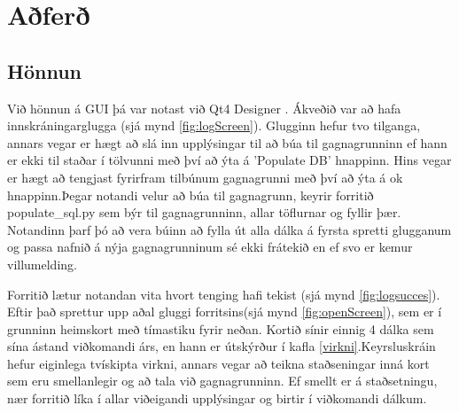 \documentclass[12pt, git, final]{rureport}
\begin{document}



\section{Aðferð}
\subsection{Hönnun}
Við hönnun á GUI þá var notast við Qt4 Designer \cite{qt4}. Ákveðið var að hafa innskráningarglugga (sjá mynd \ref{fig:logScreen}). Glugginn hefur tvo tilganga, annars vegar er hægt að slá inn upplýsingar til að búa til gagnagrunninn ef hann er ekki til staðar í tölvunni með því að ýta á 'Populate DB' hnappinn. Hins vegar er hægt að tengjast fyrirfram tilbúnum gagnagrunni með því að ýta á ok hnappinn.Þegar notandi velur að búa til gagnagrunn, keyrir forritið populate\_sql.py sem býr til gagnagrunninn, allar töflurnar og fyllir þær. Notandinn þarf þó að vera búinn að fylla út alla dálka á fyrsta spretti glugganum og passa nafnið á nýja gagnagrunninum sé ekki frátekið en ef svo er kemur villumelding.

Forritið lætur notandan vita hvort tenging hafi tekist (sjá mynd \ref{fig:logsucces}). Eftir það sprettur upp aðal gluggi forritsins(sjá mynd \ref{fig:openScreen}), sem er í grunninn heimskort með tímastiku fyrir neðan. Kortið sínir einnig 4 dálka sem sína ástand viðkomandi árs, en hann er útskýrður  í kafla \ref{virkni}.Keyrsluskráin hefur eiginlega tvískipta virkni, annars vegar að teikna staðseningar inná kort sem eru smellanlegir og að tala við gagnagrunninn. Ef smellt er á staðsetningu, nær forritið líka í allar viðeigandi upplýsingar og birtir í viðkomandi dálkum.
 

\end{document}
